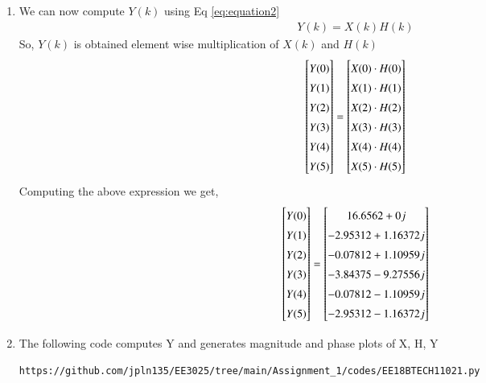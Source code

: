 \documentclass[journal,12pt,twocolumn]{IEEEtran}
\renewcommand\thesection{\arabic{section}}
\begin{document}
\begin{enumerate}[label=\thesection.\arabic*.,ref=\thesection.\theenumi]
\item We can now compute $Y(k)$ using 	Eq \eqref{eq:equation2}
\begin{align}
Y(k) = X(k)H(k)
\label{eq:equation2}
\end{align}
So, $Y(k)$ is obtained element wise multiplication of $X(k)$ and $H(k)$
\begin{equation}
\renewcommand{\arraystretch}{1.45}
\setlength\arraycolsep{0.01pt}
\begin{bmatrix} 
Y(0) \\ Y(1) \\ Y(2) \\ Y(3) \\ Y(4) \\ Y(5) 
\end{bmatrix}
=
\begin{bmatrix}
X(0)\cdot H(0) \\ X(1)\cdot H(1) \\ X(2)\cdot H(2) \\ X(3)\cdot H(3) \\ X(4)\cdot H(4) \\ X(5)\cdot H(5)
\end{bmatrix}
\end{equation}
Computing the above expression we get,
\begin{equation}
\renewcommand{\arraystretch}{1.45}
\setlength\arraycolsep{0.01pt}
\begin{bmatrix} 
Y(0) \\ Y(1) \\ Y(2) \\ Y(3) \\ Y(4) \\ Y(5) 
\end{bmatrix}
=
\begin{bmatrix}
16.6562+0j \\ -2.95312+1.16372j \\ -0.07812+1.10959j \\ -3.84375-9.27556j \\ -0.07812-1.10959j \\ -2.95312-1.16372j 
\end{bmatrix}
\end{equation}

\item The following code computes Y and generates magnitude and phase plots of X, H, Y
\begin{lstlisting}
https://github.com/jpln135/EE3025/tree/main/Assignment_1/codes/EE18BTECH11021.py
\end{lstlisting}


\end{enumerate}
\end{document}

